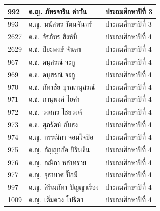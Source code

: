 \begin{center}
\begin{tabular}{ |p{3cm}|p{4cm}|p{3cm}| }
        992 & ด.ญ. ภัทรจาริน คำวัน & ประถมศึกษาปีที่ 3\\
        \hline
        993 & ด.ญ. มนัสพร รัตนจันทร์ & ประถมศึกษาปีที่ 3\\
        \hline
        2627 & ด.ช. จัรภัทร สิงห์บี้ & ประถมศึกษาปีที่ 4\\
        \hline
        2629 & ด.ช. ปิยะพงษ์ จันตา & ประถมศึกษาปีที่ 4\\
        \hline
        967 & ด.ช. ดนุสรณ์ จะกู & ประถมศึกษาปีที่ 4\\
        \hline
        969 & ด.ช. ดนุสรณ์ จะกู & ประถมศึกษาปีที่ 4\\
        \hline
        970 & ด.ช. ภัทรชัย บูรณานุสรณ์ & ประถมศึกษาปีที่ 4\\
        \hline
        971 & ด.ช. ภานุพงค์ โยคำ & ประถมศึกษาปีที่ 4\\
        \hline
        972 & ด.ช. วงศกร ไชยวงค์ & ประถมศึกษาปีที่ 4\\
        \hline
        973 & ด.ช. ศุภรัตน์ กันธง & ประถมศึกษาปีที่ 4\\
        \hline
        974 & ด.ญ. กรรณิกา จอมใจป้อ & ประถมศึกษาปีที่ 4\\
        \hline
        975 & ด.ญ. กัญญาภัค ปิรินชิน & ประถมศึกษาปีที่ 4\\
        \hline
        976 & ด.ญ. กณิกา หลำทราย & ประถมศึกษาปีที่ 4\\
        \hline
        977 & ด.ญ. จุธามาศ ปิ๊กมี & ประถมศึกษาปีที่ 4\\
        \hline
        997 & ด.ญ. สิริณภัทร ปัญญาเรือง & ประถมศึกษาปีที่ 4\\
        \hline
        1009 & ด.ญ. เต็มดวง โปธิตา & ประถมศึกษาปีที่ 4\\
        \hline
    \end{tabular}
\end{center}


